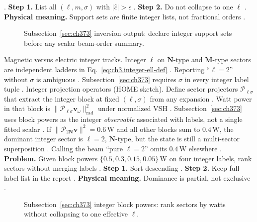 \cite{devaney2004}.
\textbf{Step 1.} List all \((\ell,m,\sigma)\) with \(|\widehat{c}|>\epsilon\) \cite{harrington2001}.
\textbf{Step 2.} Do not collapse to one \(\ell\) \cite{stratton1941}.
\textbf{Physical meaning.} Support sets are finite integer lists, not fractional orders \cite{hansen1988}.
\begin{figure}[t]
\centering
{}
\caption{Subsection~\ref{sec:ch373} inversion output: declare integer support sets before any scalar beam-order summary.}
\label{fig:ch3.373-support-set}
\end{figure}
Magnetic versus electric integer tracks. Integer \(\ell\) on \(\mathbf{N}\)-type and \(\mathbf{M}\)-type sectors are independent ladders in
Eq.~\eqref{eq:ch3.integer-ell-def} \cite{belinfante1940}. Reporting ``\(\ell=2\)'' without \(\sigma\) is ambiguous
\cite{harrington2001}. Subsection~\ref{sec:ch373} requires \(\sigma\) in every integer label tuple
\cite{hansen1988}.
Integer projection operators (HOME sketch). Define sector projectors \(\mathcal{P}_{\ell\sigma}\) that extract the integer block at fixed \((\ell,\sigma)\) from any
expansion \cite{hansen1988}. Watt power in that block is \(\|\mathcal{P}_{\ell\sigma}\mathbf{v}_\omega\|_{\mathrm{rad}}^{2}\)
under normalized VSH \cite{poynting1884}. Subsection~\ref{sec:ch373} uses block powers as the integer
\emph{observable} associated with labels, not a single fitted scalar \cite{stratton1941}.
If \(\|\mathcal{P}_{2\mathbf{N}}\mathbf{v}\|^{2}=0.6\,\mathrm{W}\) and all other blocks sum to \(0.4\,\mathrm{W}\), the dominant
integer sector is \(\ell=2\), \(\mathbf{N}\)-type, but the state is still a multi-sector superposition \cite{harrington2001}.
Calling the beam ``pure \(\ell=2\)'' omits \(0.4\,\mathrm{W}\) elsewhere \cite{stratton1941}.
\textbf{Problem.} Given block powers \(\{0.5,0.3,0.15,0.05\}\,\mathrm{W}\) on four integer labels, rank sectors without merging labels
\cite{harrington2001}.
\textbf{Step 1.} Sort descending \cite{harrington2001}.
\textbf{Step 2.} Keep full label list in the report \cite{stratton1941}.
\textbf{Physical meaning.} Dominance is partial, not exclusive \cite{hansen1988}.
\begin{figure}[t]
\centering
{}
\caption{Subsection~\ref{sec:ch373} integer block powers: rank sectors by watts without collapsing to one effective \(\ell\).}
\label{fig:ch3.373-block-ranking}
\end{figure}
